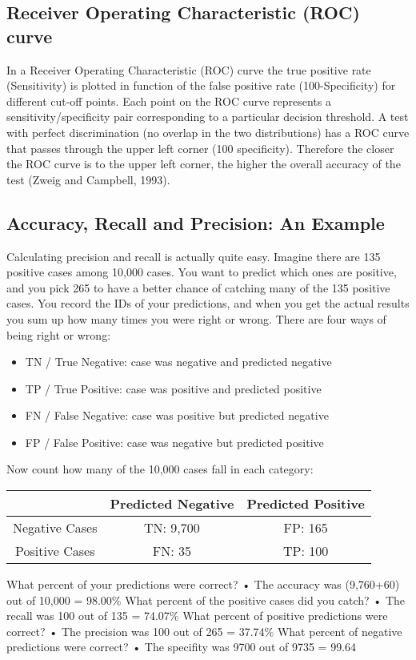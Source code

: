 \subsection*{Receiver Operating Characteristic (ROC) curve}
In a Receiver Operating Characteristic (ROC) curve the true positive rate
(Sensitivity) is plotted in function of the false positive rate (100-Specificity)
for different cut-off points. Each point on the ROC curve represents a sensitivity/specificity
pair corresponding to a particular decision threshold. A
test with perfect discrimination (no overlap in the two distributions) has a
ROC curve that passes through the upper left corner (100%
specificity). Therefore the closer the ROC curve is to the upper left corner,
the higher the overall accuracy of the test (Zweig and Campbell, 1993).
\subsection*{Accuracy, Recall and Precision: An Example}
Calculating precision and recall is actually quite easy. Imagine there are
135 positive cases among 10,000 cases. You want to predict which ones are
positive, and you pick 265 to have a better chance of catching many of the
135 positive cases. You record the IDs of your predictions, and when you
get the actual results you sum up how many times you were right or wrong.
There are four ways of being right or wrong:
\begin{itemize}
\item TN / True Negative: case was negative and predicted negative
\item TP / True Positive: case was positive and predicted positive
\item  FN / False Negative: case was positive but predicted negative
\item FP / False Positive: case was negative but predicted positive
\end{itemize}
Now count how many of the 10,000 cases fall in each category:
\begin{center}
\begin{tabular}{|c|c|c|}
  & Predicted Negative & Predicted Positive \\ \hline
Negative Cases & TN: 9,700 & FP: 165 \\ \hline
Positive Cases &  FN: 35 & TP: 100 \\ \hline
\end{tabular}
\end{center}
What percent of your predictions were correct?
• The accuracy was (9,760+60) out of 10,000 = 98.00\%
What percent of the positive cases did you catch?
• The recall was 100 out of 135 = 74.07\%
What percent of positive predictions were correct?
• The precision was 100 out of 265 = 37.74\%
What percent of negative predictions were correct?
• The specifity was 9700 out of 9735 = 99.64%
